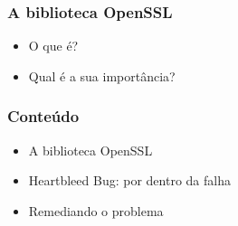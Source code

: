\documentclass{beamer}
\begin{document}
\begin{frame}
	\frametitle{A biblioteca OpenSSL}
	\begin{itemize}
		\item \textcolor{covered}{O que é?}
		\item \textcolor{covered}{Qual é a sua importância?}
	\end{itemize}
\end{frame}

\begin{frame}
	\frametitle{Conteúdo}
	\begin{itemize}
		\item \textcolor{covered}{A biblioteca OpenSSL}
		\item Heartbleed Bug: por dentro da falha
		\item Remediando o problema
	\end{itemize}
\end{frame}
\end{document}
